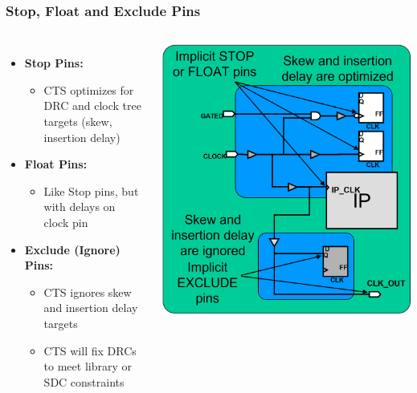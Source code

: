 \documentclass[compress]{beamer}
\begin{document}
\begin{frame}
	\frametitle{Stop, Float and Exclude Pins}
	\begin{columns}	
		\begin{itemize}
			\item \textbf{Stop Pins:}
			\begin{itemize}
				\item CTS optimizes for DRC and clock tree targets (skew, insertion delay)
			\end{itemize}
		\item \textbf{Float Pins:}
			\begin{itemize}
				\item Like Stop pins, but with delays on clock pin
			\end{itemize}
		\item \textbf{Exclude (Ignore) Pins:}
		\begin{itemize}
			\item CTS ignores skew and
			insertion delay targets
			\item CTS will fix DRCs to meet library or SDC constraints
		\end{itemize}
		\end{itemize}
		\begin{center}
		\includegraphics[width=0.8 \textwidth]{Exception}
	\end{center}
	\end{columns}
\end{frame}
\end{document}
